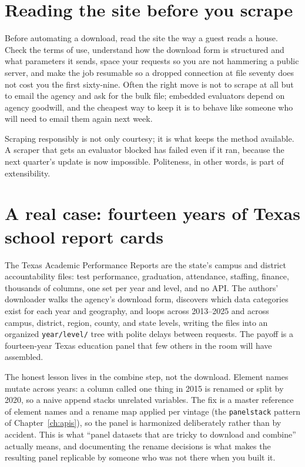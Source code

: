 \documentclass[
    a4paper,
    fontsize=10pt,
    twoside=true,
    numbers=noenddot,
]{kaobook}
\begin{document}
\section{Reading the site before you scrape}
Before automating a download, read the site the way a guest reads a house. Check the terms of use, understand how the download form is structured and what parameters it sends, space your requests so you are not hammering a public server, and make the job resumable so a dropped connection at file seventy does not cost you the first sixty-nine. Often the right move is not to scrape at all but to email the agency and ask for the bulk file; embedded evaluators depend on agency goodwill, and the cheapest way to keep it is to behave like someone who will need to email them again next week.

Scraping responsibly is not only courtesy; it is what keeps the method available. A scraper that gets an evaluator blocked has failed even if it ran, because the next quarter's update is now impossible. Politeness, in other words, is part of extensibility.

\section{A real case: fourteen years of Texas school report cards}
The Texas Academic Performance Reports are the state's campus and district accountability files: test performance, graduation, attendance, staffing, finance, thousands of columns, one set per year and level, and no API. The authors' downloader walks the agency's download form, discovers which data categories exist for each year and geography, and loops across 2013--2025 and across campus, district, region, county, and state levels, writing the files into an organized \texttt{year/level/} tree with polite delays between requests. The payoff is a fourteen-year Texas education panel that few others in the room will have assembled.

The honest lesson lives in the combine step, not the download. Element names mutate across years: a column called one thing in 2015 is renamed or split by 2020, so a naive append stacks unrelated variables. The fix is a master reference of element names and a rename map applied per vintage (the \texttt{panelstack} pattern of Chapter~\ref{ch:apis}), so the panel is harmonized deliberately rather than by accident. This is what \enquote{panel datasets that are tricky to download and combine} actually means, and documenting the rename decisions is what makes the resulting panel replicable by someone who was not there when you built it.
\end{document}
